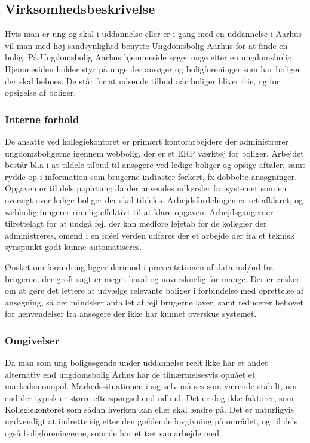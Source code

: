\documentclass[12pt, a4paper]{report}
\begin{document}
\subsection{Virksomhedsbeskrivelse}
Hvis man er ung og skal i uddannelse eller er i gang med en uddannelse i Aarhus vil man med høj sandsynlighed benytte Ungdomsbolig Aarhus for at finde en bolig. På Ungdomsbolig Aarhus hjemmeside søger unge efter en ungdomsbolig. Hjemmesiden holder styr på unge der ansøger og boligforeninger som har boliger der skal beboes. De står for at udsende tilbud når boliger bliver frie, og for opsigelse af boliger.

  \subsubsection{Interne forhold}
De ansatte ved kollegiekontoret er primært kontorarbejdere der administrerer ungdomsboligerne igennem webbolig, der er et ERP værktøj for boliger. Arbejdet består bl.a i at tildele tilbud til ansøgere ved ledige boliger og opsige aftaler, samt rydde op i information som brugerne indtaster forkert, fx dobbelte ansøgninger. Opgaven er til dels papirtung da der anvendes udkørsler fra systemet som en oversigt over ledige boliger der skal tildeles. Arbejdsfordelingen er ret afklaret, og webbolig fungerer rimelig effektivt til at klare opgaven. Arbejdsgangen er tilrettelagt for at undgå fejl der kan medføre lejetab for de kollegier der administreres, omend i en idéel verden udføres der et arbejde der fra et teknisk synspunkt godt kunne automatiseres.

Ønsket om forandring ligger derimod i præsentationen af data ind/ud fra brugerne, der groft sagt er meget basal og uoverskuelig for mange. Der er ønsker om at gøre det lettere at udvælge relevante boliger i forbindelse med oprettelse af ansøgning, så det mindsker antallet af fejl brugerne laver, samt reducerer behovet for henvendelser fra ansøgere der ikke har kunnet overskue systemet.
  \subsubsection{Omgivelser}
Da man som ung boligsøgende under uddannelse reelt ikke har et andet alternativ end ungdomsbolig Århus har de tilnærmelsesvis opnået et markedsmonopol. Markedssituationen i sig selv må ses som værende stabilt, om end der typisk er større efterspørgsel end udbud. Det er dog ikke faktorer, som Kollegiekontoret som sådan hverken kan eller skal ændre på. Det er naturligvis nødvendigt at indrette sig efter den gældende lovgivning på området, og til dels også boligforeningerne, som de har et tæt samarbejde med.
\end{document}
